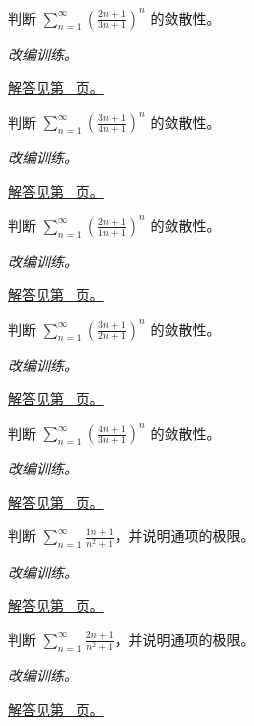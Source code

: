 \documentclass[12pt,fontset=fandol]{ctexart}
\begin{document}
\begin{example}[根值判别的直接使用]\label{ex:c25q8}
判断 $\displaystyle\sum_{n=1}^\infty\left(\frac{2n+1}{3n+1}\right)^n$ 的敛散性。
\par\textit{改编训练。}\par\hyperref[ans:c25q8]{解答见第~\pageref{ans:c25q8} 页。}
\end{example}
\begin{example}[根值判别的直接使用]\label{ex:c25q9}
判断 $\displaystyle\sum_{n=1}^\infty\left(\frac{3n+1}{4n+1}\right)^n$ 的敛散性。
\par\textit{改编训练。}\par\hyperref[ans:c25q9]{解答见第~\pageref{ans:c25q9} 页。}
\end{example}
\begin{example}[根值判别的直接使用]\label{ex:c25q10}
判断 $\displaystyle\sum_{n=1}^\infty\left(\frac{2n+1}{1n+1}\right)^n$ 的敛散性。
\par\textit{改编训练。}\par\hyperref[ans:c25q10]{解答见第~\pageref{ans:c25q10} 页。}
\end{example}
\begin{example}[根值判别的直接使用]\label{ex:c25q11}
判断 $\displaystyle\sum_{n=1}^\infty\left(\frac{3n+1}{2n+1}\right)^n$ 的敛散性。
\par\textit{改编训练。}\par\hyperref[ans:c25q11]{解答见第~\pageref{ans:c25q11} 页。}
\end{example}
\begin{example}[根值判别的直接使用]\label{ex:c25q12}
判断 $\displaystyle\sum_{n=1}^\infty\left(\frac{4n+1}{3n+1}\right)^n$ 的敛散性。
\par\textit{改编训练。}\par\hyperref[ans:c25q12]{解答见第~\pageref{ans:c25q12} 页。}
\end{example}
\begin{example}[通项趋零与调和型发散]\label{ex:c25q13}
判断 $\displaystyle\sum_{n=1}^\infty\frac{1n+1}{n^2+1}$，并说明通项的极限。
\par\textit{改编训练。}\par\hyperref[ans:c25q13]{解答见第~\pageref{ans:c25q13} 页。}
\end{example}
\begin{example}[通项趋零与调和型发散]\label{ex:c25q14}
判断 $\displaystyle\sum_{n=1}^\infty\frac{2n+1}{n^2+1}$，并说明通项的极限。
\par\textit{改编训练。}\par\hyperref[ans:c25q14]{解答见第~\pageref{ans:c25q14} 页。}
\end{example}
\end{document}
